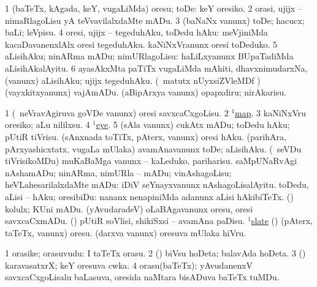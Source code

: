 \bentry
{} 
\gl{\sakirx}
\expl{}
\bmng
\bnum
\num{1} (baTeTx, kAgada, keY, \mo vugaLiMda) oresu; toDe:  keY oresiko. 
\num{2} orasi, ujijx -- nimaRlagoLisu yA teVvavilalxdaMte mADu. 
\num{3} (baNaNx \mo vanunx) toDe; hacucx; baLi; leVpisu. 
\num{4} oresi, ujijx -- tegeduhAku, toDedu hAku:  meVjiniMda kacaDavanenxlAlx oresi tegeduhAku.  kaNiNxVranunx oresi toDeduko. 
\num{5} aLisihAku; ninARma mADu; nimURlagoLisu:  haLiLxyanunx BUpaTadiMda aLisihAkalAyitu. 
\num{6} ayasAkxMta paTiTx \mo vugaLiMda mAhiti, dhavxnimudarxNa, (\mo vanunx) aLisihAku; ujijx tegeduhAku. 
 (\AseTxrXV\ matutx nUyxsiZVleMDf \ashi) 
\banum
{} (vayxkitxyanunx) vajAmADu. 
 (aBipArxya \mo vanunx) opapxdiru; nirAkarisu. 
\eanum
\numie
\enum
\emng

\noindent
\gl{\pagu}
\bmng
\bnum
\num{1}  (\kanmu\ neVravAgiruva goVDe \mo vanunx) oresi savxcaCxgoLisu. 
\num{2}  \hyperref{kandict_m.pdf}{M}{map(1) pagu(4)}{$^1$map}. 
\num{3}  kaNiNxVru oresiko; aLu nililxsu. 
\num{4}  \hyperref{kandict_e.pdf}{E}{eye(1) nuga(53)}{$^1$eye}. 
\num{5}  (sAla \mo vanunx) cukAtx mADu; toDedu hAku; pUtiR tiVrisu. 
  
\banum
{} (sAnxnada toTiTx, pAterx, \mo vanunx) oresi hAku. 
 (parihAra, pArxyashicxtatx, \mo vugaLa mUlaka) avamAnavanunx toDe; aLisihAku. 
 (\kanmu\ seVDu tiVrisikoMDu) muKaBaMga \mo vanunx -- kaLeduko, pariharisu. 
 saMpUNaRvAgi nAshamADu; ninARma, nimURla -- mADu; vinAshagoLisu; heVLahesarilalxdaMte mADu:  iDiV seYnayxvanunx nAshagoLisalAyitu. 
 toDedu, aLisi -- hAku; oresibiDu:  nananx nenapiniMda adanunx aLisi hAkibiTeTx. 
 (\ashi) kolulx; KUni mADu. 
 (yAvudaradeV) oLaBAgavanunx oresu, oresi savxcaCxmADu. 
\eanum
\numie
{} 
\banum
{}  (\AmA) pUtiR soVlisi, shikiSxsi -- avamAna paDisu. 
  \hyperref{kandict_s.pdf}{S}{slate(1) pagu(5)}{$^1$slate}  
\eanum
\numie
{}  
\banum
{} (\birx) (pAterx, taTeTx, \mo vanunx) oresu. 
 (darxva \mo vanunx) oresuva mUlaka hiVru. 
\eanum
\numie
\enum
\emng
\eentry

\bentry
{}
\gl{\nA}
\bmng
\bnum
\num{1} orasike; orasuvudu:  I taTeTx orasu. 
\num{2} (\ashi) biVsu hoDeta; balavAda hoDeta. 
\num{3} (\ashi) karavasatxrX; keY oresuva cwka. 
\num{4} orasu(baTeTx); yAvudanenxV savxcaCxgoLisalu baLasuva, oresida naMtara bisADuva baTeTx tuMDu. 
\enum
\emng
\eentry

